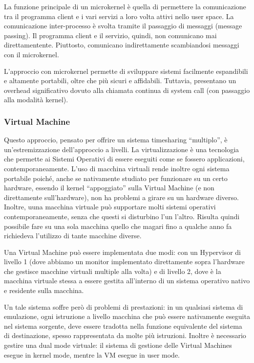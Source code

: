 \documentclass[a4paper]{article}
\begin{document}
La funzione principale di un microkernel è quella di permettere la comunicazione tra il programma client e i vari servizi a loro volta attivi nello user space. La comunicazione inter-processo è svolta tramite il passaggio di messaggi (message passing). Il programma client e il servizio, quindi, non comunicano mai direttamentente. Piuttosto, comunicano indirettamente scambiandosi messaggi con il microkernel.

L'approccio con microkernel permette di sviluppare sistemi facilmente espandibili e altamente portabili, oltre che più sicuri e affidabili. Tuttavia, presentano un overhead significativo dovuto alla chiamata continua di system call (con passaggio alla modalità kernel).

\subsubsection{Virtual Machine}
Questo approccio, pensato per offrire un sistema timesharing ``multiplo'', è un'estremizzazione dell'approccio a livelli. La virtualizzazione è una tecnologia che permette ai Sistemi Operativi di essere eseguiti come se fossero applicazioni, contemporaneamente. L'uso di macchina virtuali rende inoltre ogni sistema portabile poiché, anche se nativamente studiato per funzionare su un certo hardware, essendo il kernel ``appoggiato'' sulla Virtual Machine (e non direttamente sull'hardware), non ha problemi a girare su un hardware diverso. Inoltre, uuna macchina virtuale può supportare molti sistemi operativi contemporaneamente, senza che questi si disturbino l'un l'altro. Risulta quindi possibile fare su una sola macchina quello che magari fino a qualche anno fa richiedeva l'utilizzo di tante macchine diverse.

Una Virtual Machine può essere implementata due modi: con un Hypervisor di livello 1 (dove abbiamo un monitor implementato direttamente sopra l'hardware che gestisce macchine virtuali multiple alla volta) e di livello 2, dove è la macchina virtuale stessa a essere gestita all'interno di un sistema operativo nativo e residente sulla macchina.

Un tale sistema soffre però di problemi di prestazioni: in un qualsiasi sistema di emulazione, ogni istruzione a livello macchina che può essere nativamente eseguita nel sistema sorgente, deve essere tradotta nella funzione equivalente del sistema di destinazione, spesso rappresentata da molte più istruzioni. Inoltre è necessario gestire una dual mode virtuale: il sistema di gestione delle Virtual Machines esegue in kernel mode, mentre la VM esegue in user mode.
\end{document}
